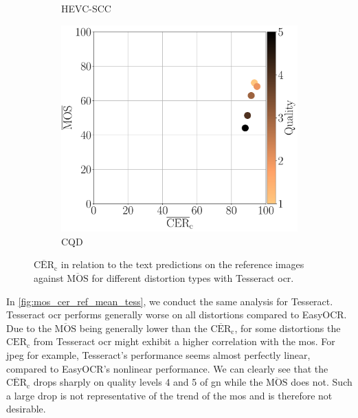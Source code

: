 \begin{figure}[h!]
\begin{subfigure}[b]{0.32\textwidth}
        \caption{HEVC-SCC}
        \label{fig:mos_cer_ref_mean_tess_HEVC-SCC}
    \end{subfigure}%
    \hfill
    \begin{subfigure}[b]{0.32\textwidth}
        \includegraphics[width=\textwidth]{../../images/analyze/mos_cer_ref_mean_tess_CQD.pdf}
        \caption{CQD}
        \label{fig:mos_cer_ref_mean_tess_CQD}
    \end{subfigure}%
    \caption{$\overline{\text{CER}}_{\text{c}}$ in relation to the text predictions on the reference images against $\overline{\text{MOS}}$ for different distortion types with Tesseract \gls{ocr}.}
\label{fig:mos_cer_ref_mean_tess}
\end{figure}

In \autoref{fig:mos_cer_ref_mean_tess}, we conduct the same analysis for Tesseract.
Tesseract \gls{ocr} performs generally worse on all distortions compared to EasyOCR.
Due to the $\overline{\text{MOS}}$ being generally lower than the $\overline{\text{CER}}_{\text{c}}$, for some distortions the $\text{CER}_{\text{c}}$ from Tesseract \gls{ocr} might exhibit a higher correlation with the \gls{mos}.
For \gls{jpeg} for example, Tesseract's performance seems almost perfectly linear, compared to EasyOCR's nonlinear performance.
We can clearly see that the $\overline{\text{CER}}_{\text{c}}$ drops sharply on quality levels 4 and 5 of \gls{gn} while the $\overline{\text{MOS}}$ does not.
Such a large drop is not representative of the trend of the \gls{mos} and is therefore not desirable.


